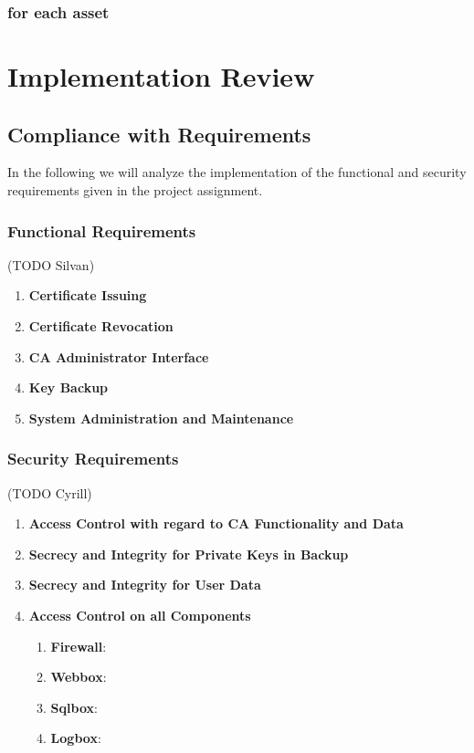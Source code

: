 \documentclass[english]{article}
\begin{document}
\subsubsection{for each asset}
	

\section{Implementation Review}
 
\subsection{Compliance with Requirements} 

In the following we will analyze the implementation of the functional and security requirements given in the project assignment.

\subsubsection{Functional Requirements} (TODO Silvan)

\begin{enumerate}

\item \textbf{Certificate Issuing}
\item \textbf{Certificate Revocation} 
\item \textbf{CA Administrator Interface}
\item \textbf{Key Backup}
\item \textbf{System Administration and Maintenance}
\end{enumerate}
\subsubsection{Security Requirements} (TODO Cyrill)
\begin{enumerate}

\item \textbf{Access Control with regard to CA Functionality and Data}
\item \textbf{Secrecy and Integrity for Private Keys in Backup}
\item \textbf{Secrecy and Integrity for User Data}
\item \textbf{Access Control on all Components}
\begin{enumerate}[label=(\alph*)]
\item \textbf{Firewall}:
\item \textbf{Webbox}:
\item \textbf{Sqlbox}:
\item \textbf{Logbox}:
\end{enumerate}
\end{enumerate}
\end{document}
